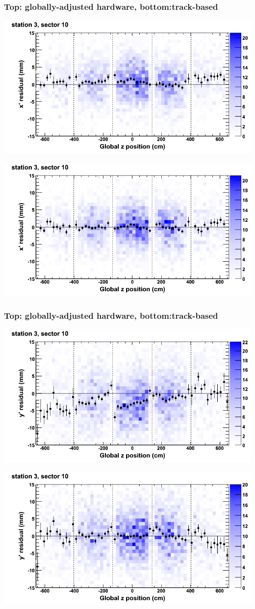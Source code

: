 \documentclass[compress]{beamer}
\begin{document}
\begin{frame}
\frametitle{Top: globally-adjusted hardware, bottom:track-based}
\includegraphics[width=0.7\linewidth]{NOV4_mapplots_HW/DTvsz_st3sec10_x.png}

\includegraphics[width=0.7\linewidth]{NOV4_mapplots/DTvsz_st3sec10_x.png}
\end{frame}

\begin{frame}
\frametitle{Top: globally-adjusted hardware, bottom:track-based}
\includegraphics[width=0.7\linewidth]{NOV4_mapplots_HW/DTvsz_st3sec10_y.png}

\includegraphics[width=0.7\linewidth]{NOV4_mapplots/DTvsz_st3sec10_y.png}
\end{frame}
\end{document}
